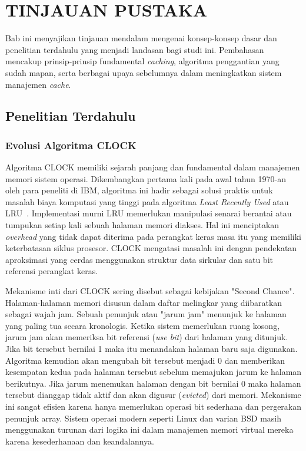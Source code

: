 \chapter{TINJAUAN PUSTAKA}
\label{chap:tinjauan_pustaka}

Bab ini menyajikan tinjauan mendalam mengenai konsep-konsep dasar dan
penelitian terdahulu yang menjadi landasan bagi studi ini. Pembahasan
mencakup prinsip-prinsip fundamental \textit{caching}, algoritma
penggantian yang sudah mapan, serta berbagai upaya sebelumnya dalam
meningkatkan sistem manajemen \textit{cache}.

\section{Penelitian Terdahulu}
\label{sec:penelitian_terdahulu}

\subsection{Evolusi Algoritma CLOCK}
Algoritma CLOCK memiliki sejarah panjang dan fundamental dalam
manajemen memori sistem operasi.
Dikembangkan pertama kali pada awal tahun 1970-an oleh para peneliti
di IBM, algoritma ini hadir sebagai solusi praktis untuk masalah
biaya komputasi yang tinggi pada algoritma \textit{Least Recently
Used} atau LRU~\cite{Tang1976Cache}.
Implementasi murni LRU memerlukan manipulasi senarai berantai atau
tumpukan setiap kali sebuah halaman memori diakses.
Hal ini menciptakan \textit{overhead} yang tidak dapat diterima pada
perangkat keras masa itu yang memiliki keterbatasan siklus prosesor.
CLOCK mengatasi masalah ini dengan pendekatan aproksimasi yang cerdas
menggunakan struktur data sirkular dan satu bit referensi perangkat keras.

Mekanisme inti dari CLOCK sering disebut sebagai kebijakan "Second Chance".
Halaman-halaman memori disusun dalam daftar melingkar yang
diibaratkan sebagai wajah jam.
Sebuah penunjuk atau "jarum jam" menunjuk ke halaman yang paling tua
secara kronologis.
Ketika sistem memerlukan ruang kosong, jarum jam akan memeriksa bit
referensi (\textit{use bit}) dari halaman yang ditunjuk.
Jika bit tersebut bernilai 1 maka itu menandakan halaman baru saja digunakan.
Algoritma kemudian akan mengubah bit tersebut menjadi 0 dan
memberikan kesempatan kedua pada halaman tersebut sebelum memajukan
jarum ke halaman berikutnya.
Jika jarum menemukan halaman dengan bit bernilai 0 maka halaman
tersebut dianggap tidak aktif dan akan digusur (\textit{evicted}) dari memori.
Mekanisme ini sangat efisien karena hanya memerlukan operasi bit
sederhana dan pergerakan penunjuk array.
Sistem operasi modern seperti Linux dan varian BSD masih menggunakan
turunan dari logika ini dalam manajemen memori virtual mereka karena
kesederhanaan dan keandalannya.

